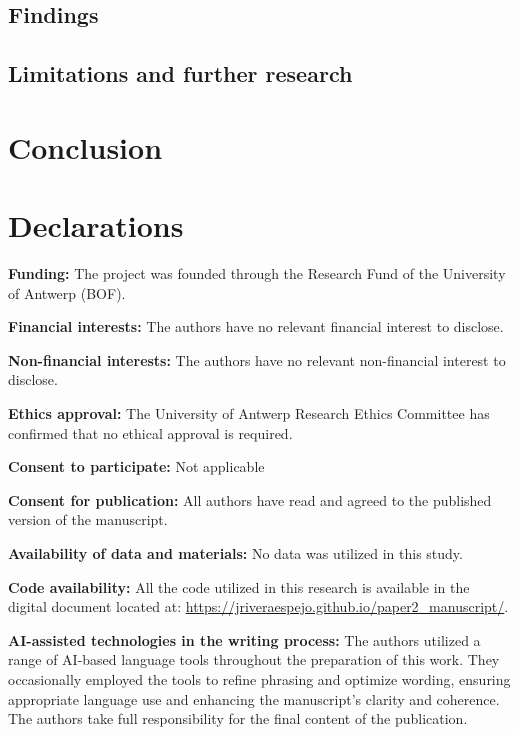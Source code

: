 \documentclass[
  authoryear,
  review,
  1p]{elsarticle}
\begin{document}
\subsection{Findings}\label{sec-discussion-finding}

\subsection{Limitations and further
research}\label{sec-discussion-limitations}

\section{Conclusion}\label{sec-conclusion}

\newpage{}

\section*{Declarations}\label{declarations}

\textbf{Funding:} The project was founded through the Research Fund of
the University of Antwerp (BOF).

\textbf{Financial interests:} The authors have no relevant financial
interest to disclose.

\textbf{Non-financial interests:} The authors have no relevant
non-financial interest to disclose.

\textbf{Ethics approval:} The University of Antwerp Research Ethics
Committee has confirmed that no ethical approval is required.

\textbf{Consent to participate:} Not applicable

\textbf{Consent for publication:} All authors have read and agreed to
the published version of the manuscript.

\textbf{Availability of data and materials:} No data was utilized in
this study.

\textbf{Code availability:} All the code utilized in this research is
available in the digital document located at:
\url{https://jriveraespejo.github.io/paper2_manuscript/}.

\textbf{AI-assisted technologies in the writing process:} The authors
utilized a range of AI-based language tools throughout the preparation
of this work. They occasionally employed the tools to refine phrasing
and optimize wording, ensuring appropriate language use and enhancing
the manuscript's clarity and coherence. The authors take full
responsibility for the final content of the publication.
\end{document}

